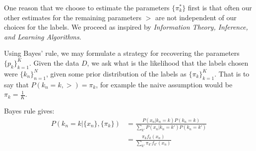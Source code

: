 One reason that we choose to estimate the parameters $\{\pi_k^\ast\}$ first is that often our other estimates for the remaining parameters $\gt$ are not independent of our choices for the labels.  We proceed as inspired by \textit{Information Theory, Inference, and Learning Algorithms}\citep{MacKay2002}.

Using Bayes' rule, we may formulate a strategy for recovering the parameters $\{p_k\}_{k=1}^{K}$. Given the data $D$, we ask what is the likelihood that the labels chosen were $\{k_n\}_{n=1}^{N}$, given some prior distribution of the labels as $\{\pi_k\}_{k=1}^{K}$. That is to say that $P(k_n=k, \gt)=\pi_k$, for example the naive assumption would be $\pi_k=\frac 1K$.

Bayes rule gives:
\begin{align}\label{Bayes1}
P(k_n=k|\{x_n\},\{\pi_k\})&=\frac{P(x_n|k_n=k)P(k_n=k)}{\sum_{k'}P(x_n|k_n=k')P(k_n=k')} \nonumber \\
						  &=\frac{\pi_k f_k(x_n)}{\sum_{k'}\pi_{k'} f_{k'}(x_n)}
\end{align}

%			
%

